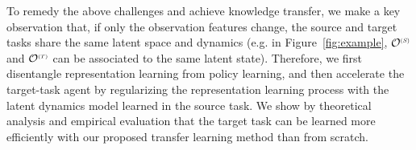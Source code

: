 

To remedy the above challenges and achieve knowledge transfer, we make a key observation that, if only the observation features change, the source and target tasks share the same latent space and dynamics
(e.g. in Figure~\ref{fig:example}, $\states\source$ and $\states\target$ can be associated to the same latent state).
Therefore, we first disentangle representation learning from policy learning, and then accelerate the target-task agent by regularizing the representation learning process with the latent dynamics model learned in the source task. We show by theoretical analysis and empirical evaluation that the target task can be learned more efficiently with our proposed transfer learning method than from scratch.


